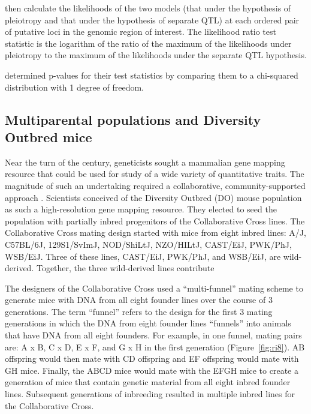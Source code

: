 \documentclass[]{article}\usepackage[]{graphicx}\usepackage[]{color}
\begin{document}
\citet{jiang1995multiple} then calculate the likelihoods of the two models
(that under the hypothesis of pleiotropy and that under the hypothesis of separate QTL)
at each ordered pair of putative loci in the genomic region of interest.
The likelihood ratio test statistic is the logarithm of the ratio of the maximum
of the likelihoods under pleiotropy to the maximum of the likelihoods under
the separate QTL hypothesis. 

\citet{jiang1995multiple} determined p-values for their test statistics by comparing
them to a chi-squared distribution with 1 degree of freedom. 





\subsection{Multiparental populations and Diversity Outbred mice}

Near the turn of the century, geneticists sought a mammalian gene mapping resource 
that could be used for study of a wide variety of quantitative traits. 
The magnitude of such an undertaking required a collaborative, community-supported
approach \citep{de2014genetics}. Scientists conceived of the Diversity Outbred (DO)
mouse population as such a high-resolution gene mapping resource.
They elected to seed the population with partially inbred progenitors of the
Collaborative Cross lines. The Collaborative Cross mating design started with
mice from eight inbred lines: A/J, C57BL/6J, 129S1/SvImJ,
NOD/ShiLtJ, NZO/HILtJ, CAST/EiJ, PWK/PhJ, WSB/EiJ. Three of these lines, CAST/EiJ, PWK/PhJ, and WSB/EiJ, are wild-derived. Together, the three wild-derived lines contribute 

The designers of the Collaborative Cross used a ``multi-funnel'' mating scheme to generate
mice with DNA from all eight founder lines over the course of 3 generations.
The term ``funnel'' refers to the design for the first 3 mating generations in which the
DNA from eight founder lines ``funnels'' into animals that have DNA from all eight founders.
For example, in one funnel, mating pairs are: A x B, C x D, E x F, and G x H in the first generation (Figure~\ref{fig:ri8}).
AB offspring would then mate with CD offspring and EF offspring would mate with GH mice.
Finally, the ABCD mice would mate with the EFGH mice to create a generation of mice that
contain genetic material from all eight inbred founder lines.
Subsequent generations of inbreeding resulted in multiple inbred lines for the Collaborative Cross.
\end{document}
